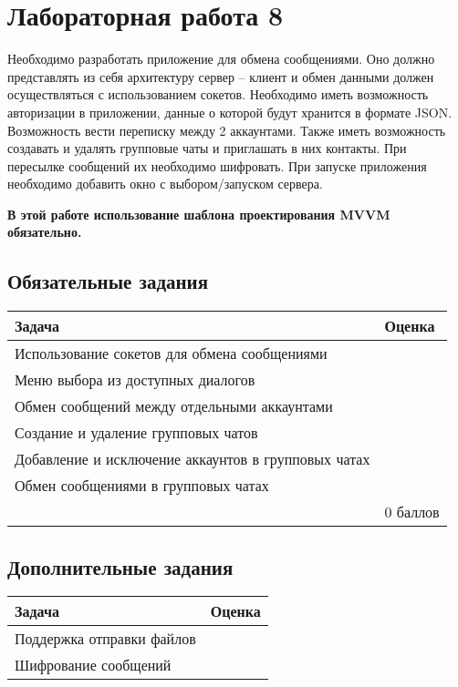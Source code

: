 \documentclass[a4paper, 13pt]{article}
\newcommand{\labstablefraction}{1/10}
\newcommand{\labstablescore}{\textwidth * \labstablefraction}
\newcommand{\labstabletask}{\textwidth * (1 - \labstablefraction) - \labstablescore - 0.83cm}
\begin{document}
\section{Лабораторная работа 8}

Необходимо разработать приложение для обмена сообщениями. Оно должно представлять из себя архитектуру сервер – клиент и обмен данными должен осуществляться с использованием сокетов. Необходимо иметь возможность авторизации в приложении, данные о которой будут хранится в формате JSON. Возможность вести переписку между 2 аккаунтами. Также иметь возможность создавать и удалять групповые чаты и приглашать в них контакты. При пересылке сообщений их необходимо шифровать. При запуске приложения необходимо добавить окно с выбором/запуском сервера.

\textbf{В этой работе использование шаблона проектирования MVVM обязательно.}

\subsection{Обязательные задания}

\begin{table}[hbt]
\begin{tabular}{|p{\labstabletask}|p{\labstablescore}|}
\hline
Задача
& Оценка   \\ \hline
Использование сокетов для обмена сообщениями
&  \\ \hline
Меню выбора из доступных диалогов
&  \\ \hline
Обмен сообщений между отдельными аккаунтами
&  \\ \hline
Создание и удаление групповых чатов
&  \\ \hline
Добавление и исключение аккаунтов в групповых чатах
&  \\ \hline
Обмен сообщениями в групповых чатах

&  \\ \hline
& 0 баллов \\ \hline
\end{tabular}
\end{table}

\subsection{Дополнительные задания}

\begin{table}[hbt]
\begin{tabular}{|p{\labstabletask}|p{\labstablescore}|}
\hline
Задача
& Оценка \\ \hline
Поддержка отправки файлов
&  \\ \hline
Шифрование сообщений
&   \\ \hline

\end{tabular}
\end{table}
\end{document}
